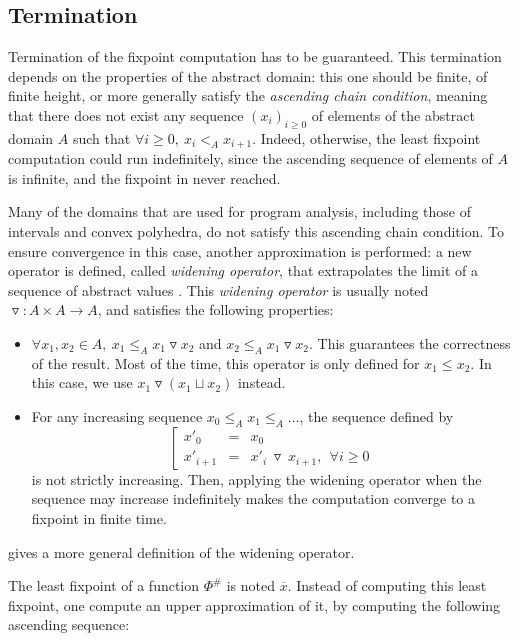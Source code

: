 \documentclass[a4paper,english,titlepage,11pt]{report}
\newcommand*\system[1]{\left[ \begin{array}{lllll}#1 \end{array}\right.}
\newcommand{\widening}{\mathop{\triangledown}}
\begin{document}
\subsection{Termination}

Termination of the fixpoint computation has to be guaranteed. This termination
depends on the properties of the abstract domain:
this one should be finite, of finite height,
or more generally satisfy the \emph{ascending chain condition},
meaning that there does not exist
any sequence $(x_i)_{i \geq 0}$ of elements of the abstract domain $A$ such that
$\forall i \geq 0,\ x_i <_A x_{i+1}$. Indeed, otherwise, the least fixpoint
computation could run indefinitely, since the ascending sequence of elements of
$A$ is infinite, and the fixpoint in never reached.


Many of the domains that are used for program analysis, including those of
intervals and convex polyhedra, do not satisfy this ascending chain condition. To ensure convergence in this case, another approximation
is performed: a new operator is defined, called \emph{widening operator}, that
extrapolates the limit of a sequence of abstract values
\cite{CC77,CousotCousot92-4}. This \emph{widening
operator} is usually noted $\widening: A \times A \rightarrow A$, and satisfies
the following properties:

\begin{itemize}
\item $\forall x_1, x_2 \in A,\ x_1 \leq_A x_1 \widening x_2$ and $x_2 \leq_A x_1
\widening x_2$. This guarantees the correctness of the result. Most of the time,
this operator is only defined for $x_1 \leq x_2$. In this case, we use $x_1
\widening (x_1 \sqcup x_2)$ instead.
\item For any increasing sequence $x_0 \leq_A x_1 \leq_A \dots$, the sequence
defined by 
$$\system{
x'_0 & = &  x_0 \\
x'_{i+1} & = &  x'_i\ \widening\ x_{i+1},\ \  \forall i \geq 0
}$$
is not strictly increasing. Then, applying the widening operator when the
sequence may increase indefinitely makes the computation converge to a fixpoint
in finite time. 
\end{itemize}

\cite{Monniaux_HOSC09} gives a more general definition of the widening operator.

The least fixpoint of a function $\Phi^\#$ is noted $\overline{x}$.
Instead of computing this least fixpoint,
one compute an upper approximation of it, by computing the following ascending
sequence:
\end{document}
